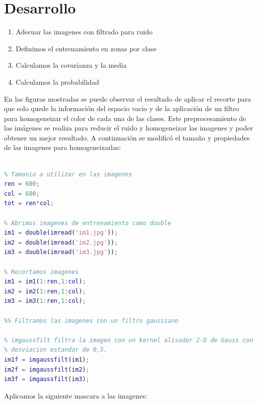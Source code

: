 \documentclass[10pt,journal,compsoc]{IEEEtran}\usepackage[T1]{fontenc}                              %
\begin{document}
 
\hfill

\section{Desarrollo}

\begin{enumerate}
  \item Adecuar las imagenes con filtrado para ruido
  \item Definimos el entrenamiento en zonas por clase
  \item Calculamos la covarianza y la media
  \item Calculamos la probabilidad
\end{enumerate}



En las figuras mostradas se puede observar el resultado de aplicar el recorte para que solo quede la información del espacio vacio y de la aplicación  de un filtro para homogeneizar el color de cada una de las clases.
Este preprocesamiento de las imágenes se realiza para reducir el ruido y homogeneizar las imagenes y poder obtener un mejor resultado.
A continuación se modificó el tamaño y propiedades de las imagenes para homogeneizarlas:

\begin{lstlisting}[language=Matlab, basicstyle=\small]

% Tamanio a utilizar en las imagenes
ren = 600;
col = 600;
tot = ren*col;

% Abrimos imagenes de entrenamiento como double
im1 = double(imread('im1.jpg'));
im2 = double(imread('im2.jpg'));
im3 = double(imread('im3.jpg'));

% Recortamos imagenes
im1 = im1(1:ren,1:col);
im2 = im2(1:ren,1:col);
im3 = im3(1:ren,1:col);

%% Filtramos las imagenes con un filtro gaussiano

% imgaussfilt filtra la imagen con un kernel alisador 2-D de Gauss con
% desviacion estandar de 0,5.
im1f = imgaussfilt(im1);
im2f = imgaussfilt(im2);
im3f = imgaussfilt(im3);

\end{lstlisting}

Aplicamos la siguiente mascara a las imagenes:
\end{document}
